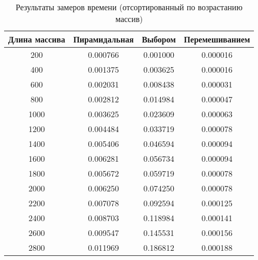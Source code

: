 \begin{table}[h]
    \begin{center}
        \begin{threeparttable}
        \captionsetup{justification=raggedright,singlelinecheck=off}
        \caption{\label{tbl:time_res_2}Результаты замеров времени (отсортированный по возрастанию массив)}
        \begin{tabular}{|c|c|c|c|}
            \hline
            Длина массива & Пирамидальная & Выбором & Перемешиванием \\
            \hline
            200 & 0.000766 & 0.001000 & 0.000016 \\ 
            \hline
            400 & 0.001375 & 0.003625 & 0.000016 \\ 
            \hline
            600 & 0.002031 & 0.008438 & 0.000031 \\ 
            \hline
            800 & 0.002812 & 0.014984 & 0.000047 \\ 
            \hline
            1000 & 0.003625 & 0.023609 & 0.000063 \\ 
            \hline
            1200 & 0.004484 & 0.033719 & 0.000078 \\ 
            \hline
            1400 & 0.005406 & 0.046594 & 0.000094 \\ 
            \hline
            1600 & 0.006281 & 0.056734 & 0.000094 \\ 
            \hline
            1800 & 0.005672 & 0.059719 & 0.000078 \\ 
            \hline
            2000 & 0.006250 & 0.074250 & 0.000078 \\ 
            \hline
            2200 & 0.007078 & 0.092594 & 0.000125 \\ 
            \hline
            2400 & 0.008703 & 0.118984 & 0.000141 \\ 
            \hline
            2600 & 0.009547 & 0.145531 & 0.000156 \\ 
            \hline
            2800 & 0.011969 & 0.186812 & 0.000188 \\ 
            \hline
		\end{tabular}
    \end{threeparttable}
\end{center}
\end{table}


